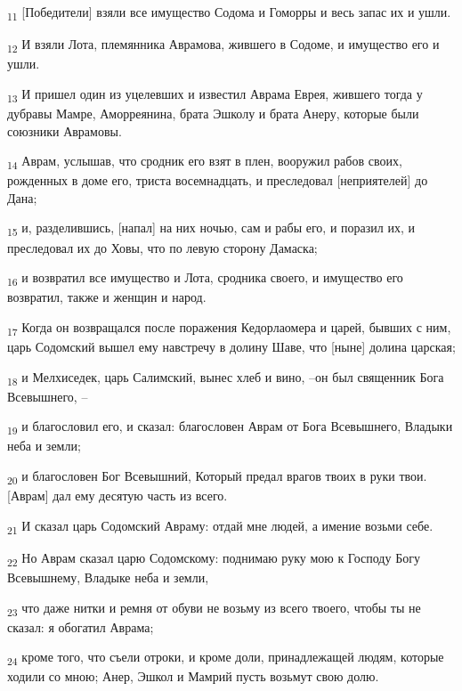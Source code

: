 \begin{tcolorbox}
\textsubscript{11} [Победители] взяли все имущество Содома и Гоморры и весь запас их и ушли.
\end{tcolorbox}
\begin{tcolorbox}
\textsubscript{12} И взяли Лота, племянника Аврамова, жившего в Содоме, и имущество его и ушли.
\end{tcolorbox}
\begin{tcolorbox}
\textsubscript{13} И пришел один из уцелевших и известил Аврама Еврея, жившего тогда у дубравы Мамре, Аморреянина, брата Эшколу и брата Анеру, которые были союзники Аврамовы.
\end{tcolorbox}
\begin{tcolorbox}
\textsubscript{14} Аврам, услышав, что сродник его взят в плен, вооружил рабов своих, рожденных в доме его, триста восемнадцать, и преследовал [неприятелей] до Дана;
\end{tcolorbox}
\begin{tcolorbox}
\textsubscript{15} и, разделившись, [напал] на них ночью, сам и рабы его, и поразил их, и преследовал их до Ховы, что по левую сторону Дамаска;
\end{tcolorbox}
\begin{tcolorbox}
\textsubscript{16} и возвратил все имущество и Лота, сродника своего, и имущество его возвратил, также и женщин и народ.
\end{tcolorbox}
\begin{tcolorbox}
\textsubscript{17} Когда он возвращался после поражения Кедорлаомера и царей, бывших с ним, царь Содомский вышел ему навстречу в долину Шаве, что [ныне] долина царская;
\end{tcolorbox}
\begin{tcolorbox}
\textsubscript{18} и Мелхиседек, царь Салимский, вынес хлеб и вино, --он был священник Бога Всевышнего, --
\end{tcolorbox}
\begin{tcolorbox}
\textsubscript{19} и благословил его, и сказал: благословен Аврам от Бога Всевышнего, Владыки неба и земли;
\end{tcolorbox}
\begin{tcolorbox}
\textsubscript{20} и благословен Бог Всевышний, Который предал врагов твоих в руки твои. [Аврам] дал ему десятую часть из всего.
\end{tcolorbox}
\begin{tcolorbox}
\textsubscript{21} И сказал царь Содомский Авраму: отдай мне людей, а имение возьми себе.
\end{tcolorbox}
\begin{tcolorbox}
\textsubscript{22} Но Аврам сказал царю Содомскому: поднимаю руку мою к Господу Богу Всевышнему, Владыке неба и земли,
\end{tcolorbox}
\begin{tcolorbox}
\textsubscript{23} что даже нитки и ремня от обуви не возьму из всего твоего, чтобы ты не сказал: я обогатил Аврама;
\end{tcolorbox}
\begin{tcolorbox}
\textsubscript{24} кроме того, что съели отроки, и кроме доли, принадлежащей людям, которые ходили со мною; Анер, Эшкол и Мамрий пусть возьмут свою долю.
\end{tcolorbox}
